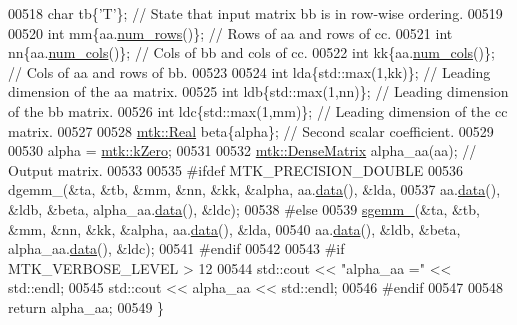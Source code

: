 \begin{DoxyCode}
00518   \textcolor{keywordtype}{char} tb\{\textcolor{charliteral}{'T'}\}; \textcolor{comment}{// State that input matrix bb is in row-wise ordering.}
00519 
00520   \textcolor{keywordtype}{int} mm\{aa.\hyperlink{classmtk_1_1DenseMatrix_a53f3afb3b6a8d21854458aaa9663cc74}{num\_rows}()\};  \textcolor{comment}{// Rows of aa and rows of cc.}
00521   \textcolor{keywordtype}{int} nn\{aa.\hyperlink{classmtk_1_1DenseMatrix_a41747502d468c6728a4be31501b16e0e}{num\_cols}()\};  \textcolor{comment}{// Cols of bb and cols of cc.}
00522   \textcolor{keywordtype}{int} kk\{aa.\hyperlink{classmtk_1_1DenseMatrix_a41747502d468c6728a4be31501b16e0e}{num\_cols}()\};  \textcolor{comment}{// Cols of aa and rows of bb.}
00523 
00524   \textcolor{keywordtype}{int} lda\{std::max(1,kk)\};  \textcolor{comment}{// Leading dimension of the aa matrix.}
00525   \textcolor{keywordtype}{int} ldb\{std::max(1,nn)\};  \textcolor{comment}{// Leading dimension of the bb matrix.}
00526   \textcolor{keywordtype}{int} ldc\{std::max(1,mm)\};  \textcolor{comment}{// Leading dimension of the cc matrix.}
00527 
00528   \hyperlink{group__c01-roots_gac080bbbf5cbb5502c9f00405f894857d}{mtk::Real} beta\{alpha\}; \textcolor{comment}{// Second scalar coefficient.}
00529 
00530   alpha = \hyperlink{group__c01-roots_ga59a451a5fae30d59649bcda274fea271}{mtk::kZero};
00531 
00532   \hyperlink{classmtk_1_1DenseMatrix}{mtk::DenseMatrix} alpha\_aa(aa); \textcolor{comment}{// Output matrix.}
00533 
00535 \textcolor{preprocessor}{  #ifdef MTK\_PRECISION\_DOUBLE}
00536   dgemm\_(&ta, &tb, &mm, &nn, &kk, &alpha, aa.\hyperlink{classmtk_1_1DenseMatrix_a0c33b8a9e01d157c61ddbdf807c25d84}{data}(), &lda,
00537          aa.\hyperlink{classmtk_1_1DenseMatrix_a0c33b8a9e01d157c61ddbdf807c25d84}{data}(), &ldb, &beta, alpha\_aa.\hyperlink{classmtk_1_1DenseMatrix_a0c33b8a9e01d157c61ddbdf807c25d84}{data}(), &ldc);
00538 \textcolor{preprocessor}{  #else}
00539   \hyperlink{namespacemtk_adb7c0560326b8e57f255e58b87ec76b0}{sgemm\_}(&ta, &tb, &mm, &nn, &kk, &alpha, aa.\hyperlink{classmtk_1_1DenseMatrix_a0c33b8a9e01d157c61ddbdf807c25d84}{data}(), &lda,
00540          aa.\hyperlink{classmtk_1_1DenseMatrix_a0c33b8a9e01d157c61ddbdf807c25d84}{data}(), &ldb, &beta, alpha\_aa.\hyperlink{classmtk_1_1DenseMatrix_a0c33b8a9e01d157c61ddbdf807c25d84}{data}(), &ldc);
00541 \textcolor{preprocessor}{  #endif}
00542 
00543 \textcolor{preprocessor}{  #if MTK\_VERBOSE\_LEVEL > 12}
00544   std::cout << \textcolor{stringliteral}{"alpha\_aa ="} << std::endl;
00545   std::cout << alpha\_aa << std::endl;
00546 \textcolor{preprocessor}{  #endif}
00547 
00548   \textcolor{keywordflow}{return} alpha\_aa;
00549 \}
\end{DoxyCode}
